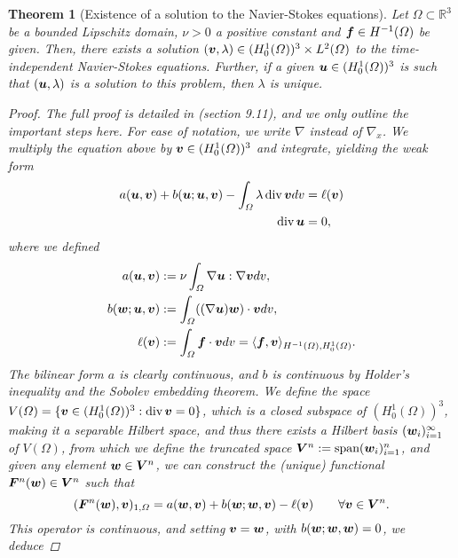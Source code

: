 \documentclass{article}
\renewcommand{\vec}{\vectorsym}
\DeclareMathOperator{\dive}{\text{div}}
\newcommand{\R}{\mathbb{R}}
\newcommand{\vx}{\nabla_x}
\newtheorem{theorem}{Theorem}
\begin{document}
\begin{theorem}[Existence of a solution to the Navier-Stokes equations]
    Let $\Omega\subset\R^3$ be a bounded Lipschitz domain, $\nu>0$ a positive constant and $\vec f\in H^{-1}(\Omega)$ be given. Then, there exists a solution $(\vec v, \lambda)\in (H_0^1(\Omega))^3\times L^2(\Omega)$ to the time-independent Navier-Stokes equations. Further, if a given $\vec u\in (H_0^1(\Omega))^3$ is such that $(\vec u, \lambda)$ is a solution to this problem, then $\lambda$ is unique. 
    \begin{proof}
        The full proof is detailed in \cite{ciarlet2013linear} (section 9.11), and we only outline the important steps here. For ease of notation, we write $\nabla$ instead of $\vx$. We multiply the equation above by $\vec v \in (H_0^1(\Omega))^3$ and integrate, yielding the weak form
        \begin{align*}
            a(\vec u, \vec v) + b(\vec u; \vec u,\vec v) - \int_\Omega\lambda\dive\vec vdv &= \ell(\vec v)\\
            \dive\vec u &= 0,
        \end{align*}
        where we defined 
        \begin{align*}
            a(\vec u, \vec v) &:= \nu\int_\Omega \nabla\vec u:\nabla\vec v dv,\\
            b(\vec w; \vec u,\vec v) &:= \int_\Omega ((\nabla\vec u)\vec w)\cdot\vec v dv,\\
            \ell(\vec v) &:=  \int_\Omega \vec f\cdot\vec v dv = \langle \vec f, \vec v\rangle_{H^{-1}(\Omega), H_0^1(\Omega)}.
        \end{align*}
        The bilinear form $a$ is clearly continuous, and $b$ is continuous by Holder's inequality and the Sobolev embedding theorem. We define the space $V(\Omega) = \{\vec v \in(H_0^1(\Omega))^3: \dive\vec v = 0\}$, which is a closed subspace of $(H_0^1(\Omega))^3$, making it a separable Hilbert space, and thus there exists a Hilbert basis $(\vec w_i)_{i=1}^\infty$ of $V(\Omega)$, from which we define the truncated space $\vec V^n := \text{span}(\vec w_i)_{i=1}^n$, and given any element $\vec w\in\vec V^n$, we can construct the (unique) functional $\vec F^n(\vec w)\in \vec V^n$ such that 
        \begin{equation*}
            (\vec F^n(\vec w), \vec v)_{1,\Omega} = a(\vec w, \vec v) + b(\vec w; \vec w, \vec v) - \ell(\vec v) \qquad \forall \vec v\in\vec V^n.
        \end{equation*}
        This operator is continuous, and setting $\vec v =\vec w$, with $b(\vec w;\vec w, \vec w) = 0$, we deduce 

\end{proof}
\end{theorem}
\end{document}
